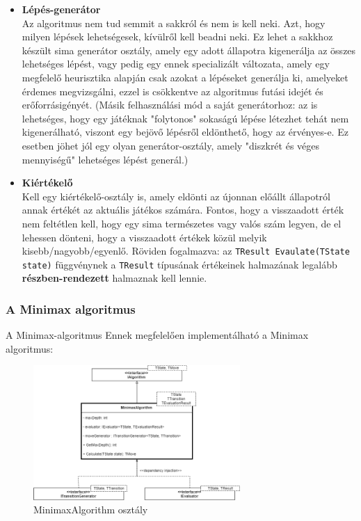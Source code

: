 \documentclass[twoside, a4paper, 12pt]{article}
\begin{document}
\begin{itemize}
	\item \textbf{Lépés-generátor} \\
	Az algoritmus nem tud semmit a sakkról és nem is kell neki. Azt, hogy milyen lépések lehetségesek, kívülről kell beadni neki. Ez lehet a sakkhoz készült sima generátor osztály, amely egy adott állapotra kigenerálja az összes lehetséges lépést, vagy pedig egy ennek specializált változata, amely egy megfelelő heurisztika alapján csak azokat a lépéseket generálja ki, amelyeket érdemes megvizsgálni, ezzel is csökkentve az algoritmus futási idejét és erőforrásigényét. (Másik felhasználási mód a saját generátorhoz: az is lehetséges, hogy egy játéknak "folytonos" sokaságú lépése létezhet tehát nem kigenerálható, viszont egy bejövő lépésről eldönthető, hogy az érvényes-e. Ez esetben jöhet jól egy olyan generátor-osztály, amely "diszkrét és véges mennyiségű" lehetséges lépést generál.)
	
	\item \textbf{Kiértékelő} \\
	Kell egy kiértékelő-osztály is, amely eldönti az újonnan előállt állapotról annak értékét az aktuális játékos számára. Fontos, hogy a visszaadott érték nem feltétlen kell, hogy egy sima természetes vagy valós szám legyen, de el lehessen dönteni, hogy a visszaadott értékek közül melyik kisebb/nagyobb/egyenlő. Röviden fogalmazva: az \texttt{TResult Evaulate(TState state)} függvénynek a \texttt{TResult} típusának értékeinek halmazának legalább \textbf{részben-rendezett} halmaznak kell lennie.
\end{itemize}

\subsubsection{A Minimax algoritmus}
A Minimax-algoritmus 
Ennek megfelelően implementálható a Minimax algoritmus:

\begin{figure}[htbp]
	\centering
	\includegraphics[width=0.7\textwidth]{img/minimaxAbstractDiagram.png}
	\caption{MinimaxAlgorithm osztály}
	\label{fig:minimaxAbstractDiagram}
\end{figure}
\end{document}
